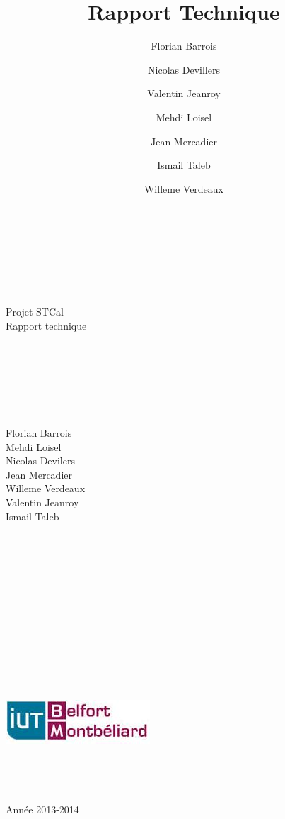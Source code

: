 \documentclass[a4paper,10pt]{report}
\title{Rapport Technique}
\author{Florian Barrois \and Nicolas Devillers \and Valentin Jeanroy \and Mehdi Loisel \and Jean Mercadier \and Ismail Taleb \and Willeme Verdeaux}
\begin{document}
  \begin{titlepage}

    \begin{center}
    ~\\~\\~\\~\\~\\
    \Huge
    Projet STCal\\
    \LARGE
    Rapport technique\\
    ~\\~\\~\\~\\~\\~\\
      \begin{multicols}{3}
	\large
	Florian Barrois\\Mehdi Loisel\\
	\columnbreak 
	Nicolas Devilers\\Jean Mercadier\\Willeme Verdeaux\\
	\columnbreak
	Valentin Jeanroy\\Ismail Taleb
      \end{multicols}
    \end{center}


  \begin{center}
  ~\\~\\~\\~\\~\\~\\~\\~\\~\\~\\~\\~\\
  \includegraphics{../general/iutbm.jpeg}
  ~\\~\\~\\~\\~\\
  \large
  Année 2013-2014
  \end{center}

\end{titlepage}
\end{document}
